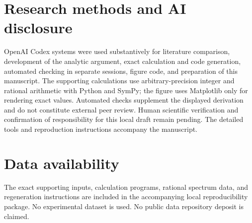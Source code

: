 \documentclass[aps,pra,reprint,amsmath,amssymb,longbibliography]{revtex4-2}
\begin{document}
\section*{Research methods and AI disclosure}

OpenAI Codex systems were used substantively for literature comparison, development of the analytic argument, exact calculation and code generation, automated checking in separate sessions, figure code, and preparation of this manuscript. The supporting calculations use arbitrary-precision integer and rational arithmetic with Python and SymPy; the figure uses Matplotlib only for rendering exact values. Automated checks supplement the displayed derivation and do not constitute external peer review. Human scientific verification and confirmation of responsibility for this local draft remain pending. The detailed tools and reproduction instructions accompany the manuscript.

\bigskip
\section*{Data availability}

The exact supporting inputs, calculation programs, rational spectrum data, and regeneration instructions are included in the accompanying local reproducibility package. No experimental dataset is used. No public data repository deposit is claimed.


\end{document}
